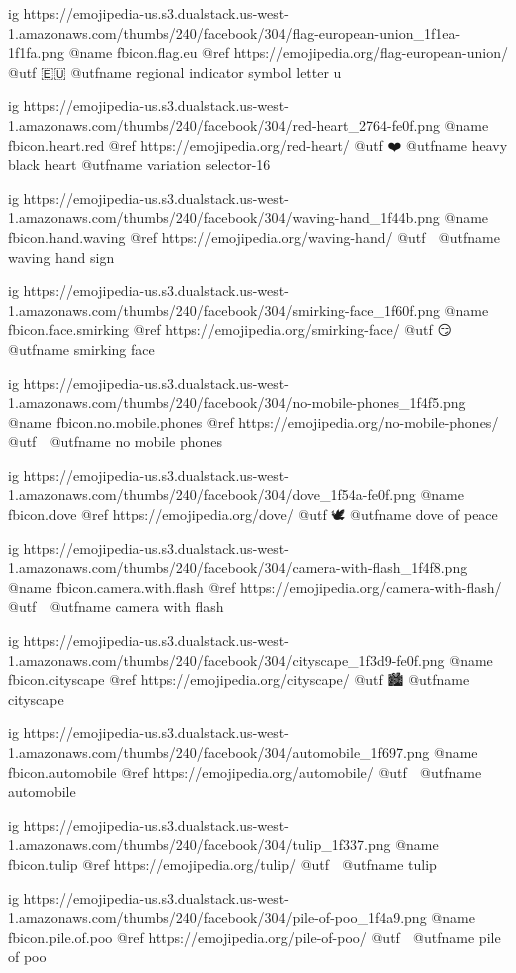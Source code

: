 	ig https://emojipedia-us.s3.dualstack.us-west-1.amazonaws.com/thumbs/240/facebook/304/flag-european-union_1f1ea-1f1fa.png
	@name fbicon.flag.eu
	@ref https://emojipedia.org/flag-european-union/
	@utf 🇪🇺
	@utfname regional indicator symbol letter u

	ig https://emojipedia-us.s3.dualstack.us-west-1.amazonaws.com/thumbs/240/facebook/304/red-heart_2764-fe0f.png
	@name fbicon.heart.red
	@ref https://emojipedia.org/red-heart/
	@utf ❤️
	@utfname heavy black heart 
	@utfname variation selector-16

	ig https://emojipedia-us.s3.dualstack.us-west-1.amazonaws.com/thumbs/240/facebook/304/waving-hand_1f44b.png
	@name fbicon.hand.waving
	@ref https://emojipedia.org/waving-hand/
	@utf 👋
	@utfname waving hand sign

	ig https://emojipedia-us.s3.dualstack.us-west-1.amazonaws.com/thumbs/240/facebook/304/smirking-face_1f60f.png
	@name fbicon.face.smirking
	@ref https://emojipedia.org/smirking-face/
	@utf 😏
	@utfname smirking face

	ig https://emojipedia-us.s3.dualstack.us-west-1.amazonaws.com/thumbs/240/facebook/304/no-mobile-phones_1f4f5.png
	@name fbicon.no.mobile.phones
	@ref https://emojipedia.org/no-mobile-phones/
	@utf 📵
	@utfname no mobile phones

	ig https://emojipedia-us.s3.dualstack.us-west-1.amazonaws.com/thumbs/240/facebook/304/dove_1f54a-fe0f.png
	@name fbicon.dove
	@ref https://emojipedia.org/dove/
	@utf 🕊️
	@utfname dove of peace

	ig https://emojipedia-us.s3.dualstack.us-west-1.amazonaws.com/thumbs/240/facebook/304/camera-with-flash_1f4f8.png
	@name fbicon.camera.with.flash
	@ref https://emojipedia.org/camera-with-flash/
	@utf 📸
	@utfname camera with flash

	ig https://emojipedia-us.s3.dualstack.us-west-1.amazonaws.com/thumbs/240/facebook/304/cityscape_1f3d9-fe0f.png
	@name fbicon.cityscape
	@ref https://emojipedia.org/cityscape/
	@utf 🏙️
	@utfname cityscape

	ig https://emojipedia-us.s3.dualstack.us-west-1.amazonaws.com/thumbs/240/facebook/304/automobile_1f697.png
	@name fbicon.automobile
	@ref https://emojipedia.org/automobile/
	@utf 🚗
	@utfname automobile

	ig https://emojipedia-us.s3.dualstack.us-west-1.amazonaws.com/thumbs/240/facebook/304/tulip_1f337.png
	@name fbicon.tulip
	@ref https://emojipedia.org/tulip/
	@utf 🌷
	@utfname tulip
	
	ig https://emojipedia-us.s3.dualstack.us-west-1.amazonaws.com/thumbs/240/facebook/304/pile-of-poo_1f4a9.png
	@name fbicon.pile.of.poo
	@ref https://emojipedia.org/pile-of-poo/
	@utf 💩
	@utfname pile of poo

